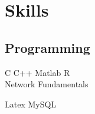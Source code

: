 \documentclass[letterpaper]{deedy-resume} %
\begin{document}
\begin{minipage}[t]{0.33\textwidth}
\section{Skills}

\subsection{Programming}

C \textbullet{} C++ \textbullet{} Matlab \textbullet{} R \\ Network Fundamentals

Latex \textbullet{} MySQL \\ 


\sectionspace %


\end{minipage} %
\hfill
%
%
\end{document}
